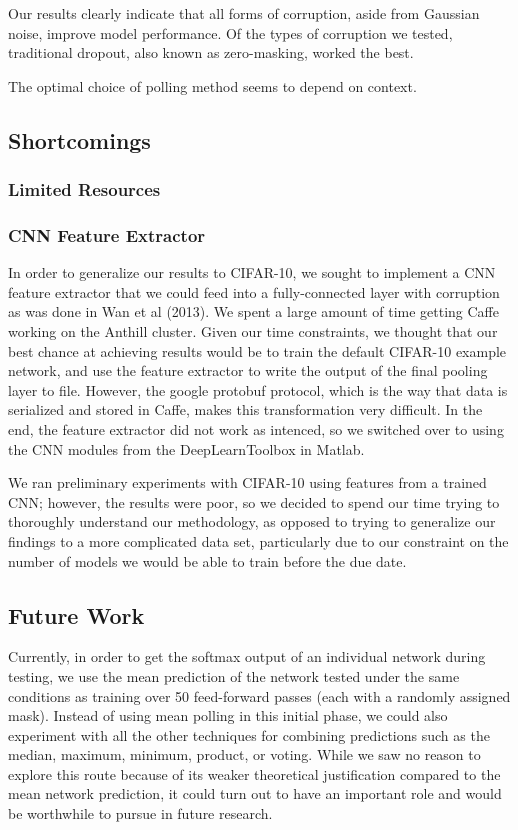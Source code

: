 \documentclass{article} %
\begin{document}
Our results clearly indicate that all forms of corruption, aside from Gaussian noise, improve model performance. Of the types of corruption we tested, traditional dropout, also known as zero-masking, worked the best.

The optimal choice of polling method seems to depend on context.

\subsection{Shortcomings}
\label{subsec:shortcomings}

\subsubsection{Limited Resources}

\subsubsection{CNN Feature Extractor}

In order to generalize our results to CIFAR-10, we sought to implement a CNN feature extractor that we could feed into a fully-connected layer with corruption as was done in Wan et al (2013). We spent a large amount of time getting Caffe working on the Anthill cluster. Given our time constraints, we thought that our best chance at achieving results would be to train the default CIFAR-10 example network, and use the feature extractor to write the output of the final pooling layer to file. However, the google protobuf protocol, which is the way that data is serialized and stored in Caffe, makes this transformation very difficult. In the end, the feature extractor did not work as intenced, so we switched over to using the CNN modules from the DeepLearnToolbox in Matlab.


We ran preliminary experiments with CIFAR-10 using features from a trained CNN; however, the results were poor, so we decided to spend our time trying to thoroughly understand our methodology, as opposed to trying to generalize our findings to a more complicated data set, particularly due to our constraint on the number of models we would be able to train before the due date.

\subsection{Future Work}

Currently, in order to get the softmax output of an individual network during testing, we use the mean prediction of the network tested under the same conditions as training over 50 feed-forward passes (each with a randomly assigned mask). Instead of using mean polling in this initial phase, we could also experiment with all the other techniques for combining predictions such as the median, maximum, minimum, product, or voting. While we saw no reason to explore this route because of its weaker theoretical justification compared to the mean network prediction, it could turn out to have an important role and would be worthwhile to pursue in future research.
\end{document}
